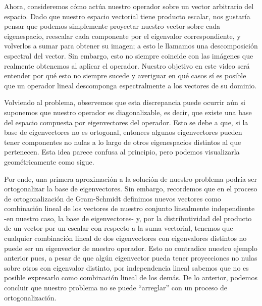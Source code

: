 \documentclass[12pt,dvipsnames]{article}
\begin{document}
Ahora, consideremos cómo actúa nuestro operador sobre un vector arbitrario del espacio. Dado que nuestro espacio vectorial tiene producto escalar, nos gustaría pensar que podemos simplemente proyectar nuestro vector sobre cada eigenespacio, reescalar cada componente por el eigenvalor correspondiente, y volverlos a sumar para obtener su imagen; a esto le llamamos una descomposición espectral del vector. Sin embargo, esto no siempre coincide con las imágenes que realmente obtenemos al aplicar el operador. Nuestro objetivo en este video será entender por qué esto no siempre sucede y averiguar en qué casos sí es posible que un operador lineal descomponga espectralmente a los vectores de su dominio.

Volviendo al problema, observemos que esta discrepancia puede ocurrir aún si suponemos que nuestro operador es diagonalizable, es decir, que existe una base del espacio compuesta por eigenvectores del operador. Esto se debe a que, si la base de eigenvectores no es ortogonal, entonces algunos eigenvectores pueden tener componentes no nulas a lo largo de otros eigenespacios distintos al que pertenecen. Esta idea parece confusa al principio, pero podemos visualizarla geométricamente como sigue.

Por ende, una primera aproximación a la solución de nuestro problema podría ser ortogonalizar la base de eigenvectores. Sin embargo, recordemos que en el proceso de ortogonalización de Gram-Schmidt definimos nuevos vectores como combinación lineal de los vectores de nuestro conjunto linealmente independiente -en nuestro caso, la base de eigenvectores- y, por la distributividad del producto de un vector por un escalar con respecto a la suma vectorial, tenemos que cualquier combinación lineal de dos eigenvectores con eigenvalores distintos no puede ser un eigenvector de nuestro operador. Esto no contradice nuestro ejemplo anterior pues, a pesar de que algún eigenvector pueda tener proyecciones no nulas sobre otros con eigenvalor distinto, por independencia lineal sabemos que no es posible expresarlo como combinación lineal de los demás. De lo anterior, podemos concluir que nuestro problema no se puede ``arreglar'' con un proceso de ortogonalización.
\end{document}

